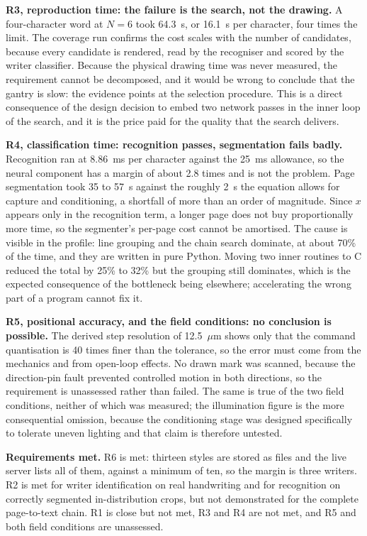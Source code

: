         \textbf{R3, reproduction time: the failure is the search, not the drawing.}
        A four-character word at $N=6$ took 64.3~s, or 16.1~s per character, four times the limit.
        The coverage run confirms the cost scales with the number of candidates, because every candidate is rendered, read by the recogniser and scored by the writer classifier.
        Because the physical drawing time was never measured, the requirement cannot be decomposed, and it would be wrong to conclude that the gantry is slow: the evidence points at the selection procedure.
        This is a direct consequence of the design decision to embed two network passes in the inner loop of the search, and it is the price paid for the quality that the search delivers.

        \textbf{R4, classification time: recognition passes, segmentation fails badly.}
        Recognition ran at 8.86~ms per character against the 25~ms allowance, so the neural component has a margin of about 2.8 times and is not the problem.
        Page segmentation took 35 to 57~s against the roughly 2~s the equation allows for capture and conditioning, a shortfall of more than an order of magnitude.
        Since $x$ appears only in the recognition term, a longer page does not buy proportionally more time, so the segmenter's per-page cost cannot be amortised.
        The cause is visible in the profile: line grouping and the chain search dominate, at about 70\% of the time, and they are written in pure Python.
        Moving two inner routines to C reduced the total by 25\% to 32\% but the grouping still dominates, which is the expected consequence of the bottleneck being elsewhere; accelerating the wrong part of a program cannot fix it.

        \textbf{R5, positional accuracy, and the field conditions: no conclusion is possible.}
        The derived step resolution of 12.5~$\mu$m shows only that the command quantisation is 40 times finer than the tolerance, so the error must come from the mechanics and from open-loop effects.
        No drawn mark was scanned, because the direction-pin fault prevented controlled motion in both directions, so the requirement is unassessed rather than failed.
        The same is true of the two field conditions, neither of which was measured; the illumination figure is the more consequential omission, because the conditioning stage was designed specifically to tolerate uneven lighting and that claim is therefore untested.

        \textbf{Requirements met.}
        R6 is met: thirteen styles are stored as files and the live server lists all of them, against a minimum of ten, so the margin is three writers.
        R2 is met for writer identification on real handwriting and for recognition on correctly segmented in-distribution crops, but not demonstrated for the complete page-to-text chain.
        R1 is close but not met, R3 and R4 are not met, and R5 and both field conditions are unassessed.


